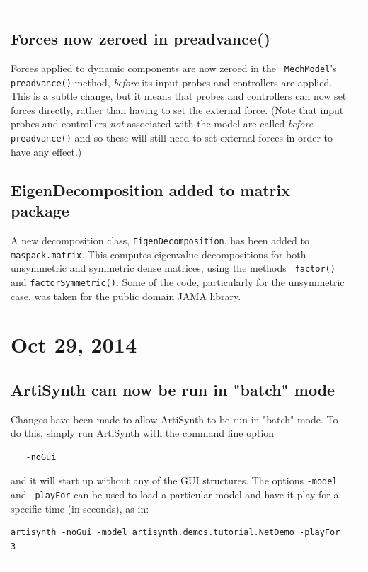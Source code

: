 \documentclass{article}
\begin{document}
\begin{tabular}{ll}
\subsection*{Forces now zeroed in preadvance()}

Forces applied to dynamic components are now zeroed in the {\tt
MechModel}'s {\tt preadvance()} method, {\it before} its input probes
and controllers are applied. This is a subtle change, but it means
that probes and controllers can now set forces directly, rather than
having to set the external force. (Note that input probes and
controllers {\it not} associated with the model are called {\it
before} {\tt preadvance()} and so these will still
need to set external forces in order to have any effect.)

\subsection*{EigenDecomposition added to matrix package}

A new decomposition class, {\tt EigenDecomposition}, has been added to
{\tt maspack.matrix}. This computes eigenvalue decompositions for both
unsymmetric and symmetric dense matrices, using the methods {\tt
factor()} and {\tt factorSymmetric()}. Some of the code, particularly
for the unsymmetric case, was taken for the public domain JAMA
library.

\section*{Oct 29, 2014}

\subsection*{ArtiSynth can now be run in "batch" mode}

Changes have been made to allow ArtiSynth to be run in "batch" mode.
To do this, simply run ArtiSynth with the command line option
%
\begin{verbatim}
   -noGui
\end{verbatim}
%
and it will start up without any of the GUI structures.  The options
{\tt -model} and {\tt -playFor} can be used to load a particular model
and have it play for a specific time (in seconds), as in:
%
\begin{lstlisting}[]
   artisynth -noGui -model artisynth.demos.tutorial.NetDemo -playFor 3
\end{lstlisting}
%


\end{tabular}
\end{document}
